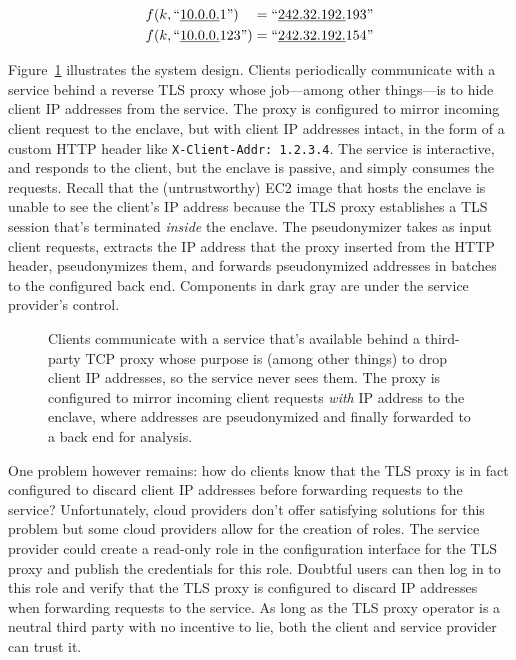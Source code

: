 \begin{align}
f(k, \textrm{``\underline{10.0.0.}1''})\phantom{23} = \textrm{``\underline{242.32.192.}193''} \\
f(k, \textrm{``\underline{10.0.0.}123''}) = \textrm{``\underline{242.32.192.}154''}
\end{align}

Figure~\ref{fig:address-anonymizer} illustrates the system design.  Clients
periodically communicate with a service behind a reverse TLS proxy whose
job---among other things---is to hide client IP addresses from the service.  The
proxy is configured to mirror incoming client request to the enclave, but with
client IP addresses intact, in the form of a custom HTTP header like
\texttt{X-Client-Addr: 1.2.3.4}.  The service is interactive, and responds to
the client, but the enclave is passive, and simply consumes the requests.
Recall that the (untrustworthy) EC2 image that hosts the enclave is unable to
see the client's IP address because the TLS proxy establishes a TLS session
that's terminated \emph{inside} the enclave.  The pseudonymizer takes as input
client requests, extracts the IP address that the proxy inserted from the HTTP
header, pseudonymizes them, and forwards pseudonymized addresses in batches to
the configured back end.  Components in dark gray are under the service
provider's control.

\begin{figure}[t]
\centering

\caption{Clients communicate with a service that's available behind a
  third-party TCP proxy whose purpose is (among other things) to drop client IP
  addresses, so the service never sees them.  The proxy is configured to mirror
  incoming client requests \emph{with} IP address to the enclave, where
  addresses are pseudonymized and finally forwarded to a back end for analysis.}
\label{fig:address-anonymizer}
\end{figure}

One problem however remains: how do clients know that the TLS proxy is in fact
configured to discard client IP addresses before forwarding requests to the
service?  Unfortunately, cloud providers don't offer satisfying solutions for
this problem but some cloud providers allow for the creation of roles.  The
service provider could create a read-only role in the configuration interface
for the TLS proxy and publish the credentials for this role.  Doubtful users can
then log in to this role and verify that the TLS proxy is configured to discard
IP addresses when forwarding requests to the service.  As long as the TLS proxy
operator is a neutral third party with no incentive to lie, both the client and
service provider can trust it.

